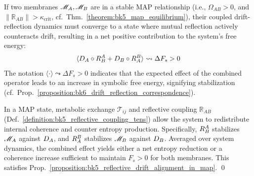 \begin{proposition}
\label{proposition:bk5_reflective_drift_alignment_in_map}
If two membranes $\mathscr{M}_A, \mathscr{M}_B$ are in a stable MAP relationship (i.e., $\Omega_{AB}>0$, and $\|\mathbb{R}_{AB}\| > \kappa_{\text{crit}}$, cf.~Thm.~\ref{theorem:bk5_map_equilibrium}), their coupled drift-reflection dynamics must converge to a state where mutual reflection actively counteracts drift, resulting in a net positive contribution to the system's free energy:
\begin{equation}
\langle D_A \circ R_B^A + D_B \circ R_A^B \rangle \leadsto \Delta F_s > 0
\end{equation}
The notation $\langle \cdot \rangle \leadsto \Delta F_s > 0$ indicates that the expected effect of the combined operator leads to an increase in symbolic free energy, signifying stabilization (cf.~Prop.~\ref{proposition:bk6_drift_reflection_correspondence}).
\end{proposition}

\begin{demonstratio}
\label{demonstratio:bk5_entropy_reduction}
In a MAP state, metabolic exchange $\mathcal{T}_{ij}$ and reflective coupling
$\mathbb{R}_{AB}$ (Def.~\ref{definition:bk5_reflective_coupling_tens}) allow
the system to redistribute internal coherence and counter entropy
production.
Specifically, $R_B^A$ stabilizes $\mathscr{M}_A$ against $D_A$, and
$R_A^B$ stabilizes $\mathscr{M}_B$ against $D_B$.
Averaged over system dynamics, the combined effect yields either a net entropy
reduction or a coherence increase sufficient to maintain $F_s > 0$ for both
membranes.
This satisfies Prop.~\ref{proposition:bk5_reflective_drift_alignment_in_map}.
\qed
\end{demonstratio}

